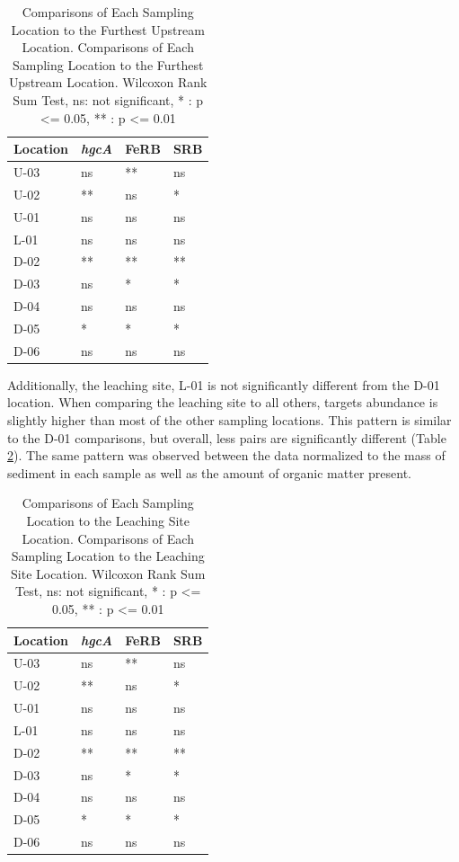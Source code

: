 \documentclass[ms, hidelinks]{uncgdissertationexp3}
\theoremstyle{plain}
\theoremstyle{definition}
\theoremstyle{remark}
\newcommand{\titlecaption}[2]{\caption[#1]{#1. #2}}
\begin{document}
\begin{table}[htbp]
  \centering
  \titlecaption{Comparisons of Each Sampling Location to the Furthest Upstream Location}{Comparisons of Each Sampling Location to the Furthest Upstream Location. Wilcoxon Rank Sum Test, ns: not significant, * : p <= 0.05, ** : p <= 0.01}\label{tab:compareU}
  \begin{tabular}{llll}
  \toprule
  Location & \textit{hgcA} & FeRB & SRB\\
  \midrule
  U-03 & ns & ** & ns\\
  U-02 & ** & ns & *\\
  U-01 & ns & ns & ns\\
  L-01 & ns & ns & ns\\
  D-02 & ** & ** & **\\
  D-03 & ns & * & *\\
  D-04 & ns & ns & ns\\
  D-05 & * & * & *\\
  D-06 & ns & ns & ns\\
  \bottomrule
  \end{tabular}
\end{table}

Additionally, the leaching site, L-01 is not significantly different from the D-01 location. When comparing the leaching site to all others, targets abundance is slightly higher than most of the other sampling locations. This pattern is similar to the D-01 comparisons, but overall, less pairs are significantly different (Table \ref{tab:compareL}). The same pattern was observed between the data normalized to the mass of sediment in each sample as well as the amount of organic matter present.

\begin{table}[htbp]
  \centering
  \titlecaption{Comparisons of Each Sampling Location to the Leaching Site Location}{Comparisons of Each Sampling Location to the Leaching Site Location. Wilcoxon Rank Sum Test, ns: not significant, * : p <= 0.05, ** : p <= 0.01}\label{tab:compareL}
  \begin{tabular}{llll}
  \toprule
  Location & \textit{hgcA} & FeRB & SRB\\
  \midrule
U-03 & ns & ** & ns\\
U-02 & ** & ns & *\\
U-01 & ns & ns & ns\\
L-01 & ns & ns & ns\\
D-02 & ** & ** & **\\
D-03 & ns & * & *\\
D-04 & ns & ns & ns\\
D-05 & * & * & *\\
D-06 & ns & ns & ns\\
  \bottomrule
  \end{tabular}
\end{table}
\end{document}

